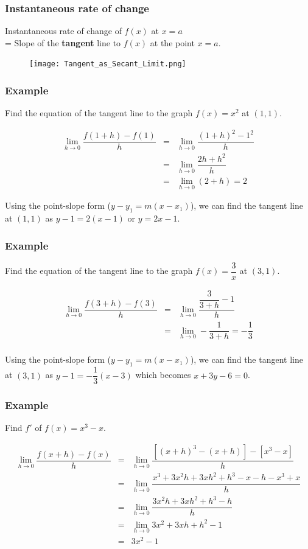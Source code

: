 \documentclass[t]{beamer}
\theoremstyle{plain}
\theoremstyle{definition}
\newcommand{\disp}{\displaystyle}
\begin{document}
\frame
{
\frametitle{Instantaneous rate of change}
Instantaneous rate of change of $f(x)$ at $x=a$ \\= Slope of the \textbf{tangent} line to $f(x)$ at the point $x=a$.

\begin{figure}[h] %
     \centering
     \texttt{[image: Tangent\_as\_Secant\_Limit.png]}
     \label{fig:4}
  \end{figure}
  }
  
 \frame
{
	\frametitle{Example}
	Find the equation of the tangent line to the graph $f(x)= x^2$ at $(1, 1)$. 
	
	\[\begin{array}{lcl}
\disp{\lim_{h\to 0}} \dfrac{f(1+h)-f(1)}{h} &=& \disp{\lim_{h\to 0}} \dfrac{(1+h)^2- 1^2}{h}\\ 
&=& \disp{\lim_{h\to 0}} \dfrac{2h+h^2}{h}\\ 
&=& \disp{\lim_{h\to 0}}  (2+h) =2 \end{array}\] 

	\vspace{2em}	
	
	Using the point-slope form ($y - y_1 = m(x - x_1)$), we can find the tangent line at $(1, 1)$ as
	$y - 1 = 2(x - 1)$  or $y = 2x - 1$.
}

\frame
{
	\frametitle{Example}
	Find the equation of the tangent line to the graph $f(x)= \dfrac{3}{x}$ at $(3,1)$. 
	
	\[\begin{array}{lcl}
\disp{\lim_{h\to 0}} \dfrac{f(3+h)-f(3)}{h} &=& \disp{\lim_{h\to 0}} \dfrac{\dfrac{3}{3 + h} - 1}{h}\\ 
&=& \disp{\lim_{h\to 0}} -\dfrac{1}{3 + h} = -\dfrac{1}{3}\\ \end{array}\] 

	\vspace{2em}	
	
	Using the point-slope form ($y - y_1 = m(x - x_1)$), we can find the tangent line at $(3, 1)$ as
	$y - 1 = -\dfrac{1}{3}(x-3)$ which becomes $x + 3y - 6 = 0$.
}

\frame
{
	\frametitle{Example}
	Find $f'$ of $f(x)= x^3 - x$. 
	
	\[\begin{array}{lcl}
 \disp{\lim_{h\to 0}} \dfrac{f(x+h) - f(x)}{h}&=& \disp{\lim_{h\to 0}} \dfrac{[(x + h)^3 - (x + h)] - [x^3 - x]}{h}\\ 
&=& \disp{\lim_{h\to 0}} \dfrac{x^3 + 3x^2h + 3xh^2 + h^3 - x - h - x^3 + x}{h}\\ 
&=& \disp{\lim_{h\to 0}} \dfrac{3x^2h + 3xh^2 + h^3 - h}{h}\\ 
&=& \disp{\lim_{h\to 0}} 3x^2 + 3xh + h^2 -1 \\&=& 3x^2 -1\\ 
\end{array}\] 
}
\end{document}
